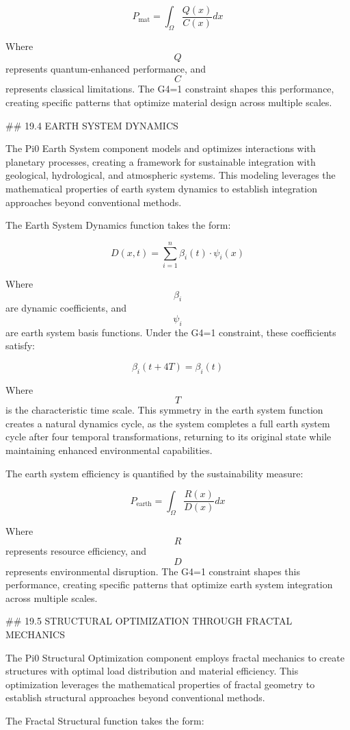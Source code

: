 $$ P_{\text{mat}} = \int_{\Omega} \frac{Q(x)}{C(x)} dx $$

Where $$ Q $$ represents quantum-enhanced performance, and $$ C $$ represents classical limitations. The G4=1 constraint shapes this performance, creating specific patterns that optimize material design across multiple scales.

## 19.4 EARTH SYSTEM DYNAMICS

The Pi0 Earth System component models and optimizes interactions with planetary processes, creating a framework for sustainable integration with geological, hydrological, and atmospheric systems. This modeling leverages the mathematical properties of earth system dynamics to establish integration approaches beyond conventional methods.

The Earth System Dynamics function takes the form:

$$ D(x, t) = \sum_{i=1}^{n} \beta_i(t) \cdot \psi_i(x) $$

Where $$ \beta_i $$ are dynamic coefficients, and $$ \psi_i $$ are earth system basis functions. Under the G4=1 constraint, these coefficients satisfy:

$$ \beta_i(t+4T) = \beta_i(t) $$

Where $$ T $$ is the characteristic time scale. This symmetry in the earth system function creates a natural dynamics cycle, as the system completes a full earth system cycle after four temporal transformations, returning to its original state while maintaining enhanced environmental capabilities.

The earth system efficiency is quantified by the sustainability measure:

$$ P_{\text{earth}} = \int_{\Omega} \frac{R(x)}{D(x)} dx $$

Where $$ R $$ represents resource efficiency, and $$ D $$ represents environmental disruption. The G4=1 constraint shapes this performance, creating specific patterns that optimize earth system integration across multiple scales.

## 19.5 STRUCTURAL OPTIMIZATION THROUGH FRACTAL MECHANICS

The Pi0 Structural Optimization component employs fractal mechanics to create structures with optimal load distribution and material efficiency. This optimization leverages the mathematical properties of fractal geometry to establish structural approaches beyond conventional methods.

The Fractal Structural function takes the form:

